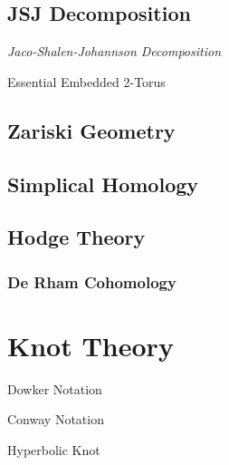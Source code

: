 \subsection{JSJ Decomposition}\label{sec:jsj_decomposition}

\emph{Jaco-Shalen-Johannson Decomposition}

Essential Embedded 2-Torus



\subsection{Zariski Geometry}\label{sec:zariski_geometry}

\subsection{Simplical Homology}\label{sec:simplical_homology}

\subsection{Hodge Theory}\label{sec:hodge_theory}

\subsubsection{De Rham Cohomology}\label{sec:derham_cohomology}



\section{Knot Theory} \label{sec:knot_theory}

Dowker Notation

Conway Notation



Hyperbolic Knot

